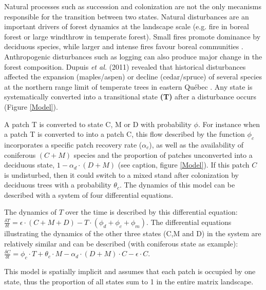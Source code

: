 Natural processes such as
succession and colonization are not the only mecanisms responsible for the transition
between two states. Natural disturbances are an important drivers of
forest dynamics at the landscape scale (e.g. fire in boreal forest or large
windthrow in temperate forest). Small fires promote dominance by deciduous
species, while larger and intense fires favour boreal communities
\cite{Bergeron2004}. Anthropogenic disturbances such as logging can also
produce major change in the forest composition. Dupuis \textit{et al.} (2011)
revealed that historical disturbances affected the 
expansion (maples/aspen) or decline (cedar/spruce) of several species at the northern range
limit of temperate trees in eastern Québec \cite{Dupuis2011}. Any state is systematically
converted into a transitional state  \textbf{(T)} after a disturbance occurs (Figure \ref{Model}). 

A patch T is converted to state C, M or D with probability $\phi$. 
For instance when a patch T is converted to  into a patch C, this
flow described by the function $\phi_c$ incorporates a specific patch recovery
rate ($\alpha_c$), as well as the availability of coniferous $(C + M)$ species
and the proportion of patches unconverted into a deciduous state, $1- \alpha_d
\cdot (D + M)$ (see caption, figure \ref{Model}). If this patch $C$ is
undisturbed, then it could switch to a mixed stand after colonization by deciduous
trees with a probability $\theta_c$. The dynamics of this model can be
described with a system of four differential equations. 

The dynamics of $T$ over the
time is described by this differential equation: $\frac{\delta T}{\delta t} =
\epsilon \cdot (C+M+D) - T \cdot (\phi_d + \phi_c + \phi_m)$. The differential
equations illustrating the dynamics of the other three states (C,M and D) in
the system are relatively similar and can be described (with coniferous state
as example): $\frac{\delta C}{\delta t} = \phi_c \cdot T + \theta_c \cdot M -
\alpha_d \cdot (D+M)\cdot C - \epsilon \cdot C$. 

This model is spatially
implicit and assumes that each patch is occupied by one state, thus the
proportion of all states sum to 1 in the entire matrix landscape. \\

